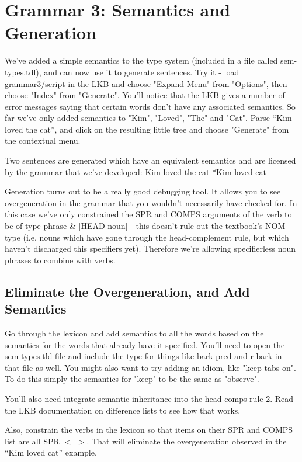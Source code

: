 
\section{Grammar 3: Semantics and Generation}

We've added a simple semantics to the type system (included in a file called sem-types.tdl), and can now use it to generate sentences.  Try it - load grammar3/script in the LKB and choose "Expand Menu" from "Options", then choose "Index" from "Generate".  You'll notice that the LKB gives a number of error messages saying that certain words don't have any associated semantics.  So far we've only added semantics to "Kim", "Loved", "The" and "Cat".  Parse ``Kim loved the cat'', and click on the resulting little tree and choose "Generate" from the contextual menu.

Two sentences are generated which have an equivalent semantics and are licensed by the grammar that we've developed:
Kim loved the cat
*Kim loved cat

Generation turns out to be a really good debugging tool.  It allows you to see overgeneration in the grammar that you wouldn't necessarily have checked for.  In this case we've only constrained the SPR and COMPS arguments of the verb to be of type phrase \& [HEAD noun] - this doesn't rule out the textbook's NOM type (i.e. nouns which have gone through the head-complement rule, but which haven't discharged this specifiers yet).  Therefore we're allowing specifierless noun phrases to combine with verbs.


\subsection{Eliminate the Overgeneration, and Add Semantics}

Go through the lexicon and add semantics to all the words based on the semantics for the words that already have it specified.  You'll need to open the sem-types.tld file and include the type for things like bark-pred and r-bark in that file as well.  You might also want to try adding an idiom, like "keep tabs on".  To do this simply the semantics for "keep" to be the same as "observe".

You'll also need integrate semantic inheritance into the head-comps-rule-2.  Read the LKB documentation on difference lists to see how that works.


Also, constrain the verbs in the lexicon so that items on their SPR and COMPS list are all SPR $<$ $>$.  That will eliminate the overgeneration observed in the ``Kim loved cat'' example.




